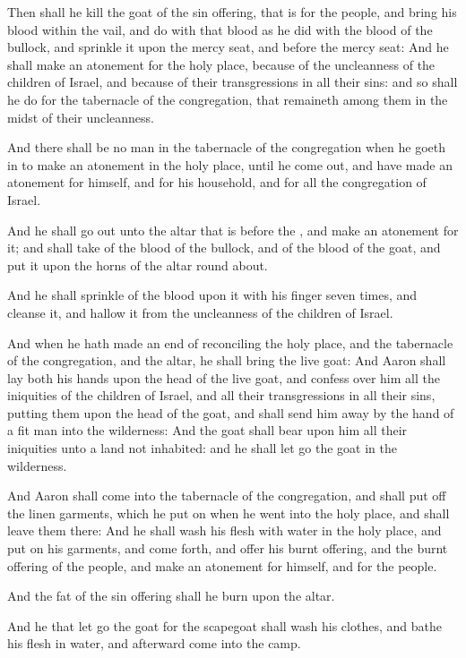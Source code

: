 \Verse Then shall he kill the goat of the sin offering, that is for the people, and bring his blood within the vail, and do with that blood as he did with the blood of the bullock, and sprinkle it upon the mercy seat, and before the mercy seat: \Verse And he shall make an atonement for the holy place, because of the uncleanness of the children of Israel, and because of their transgressions in all their sins: and so shall he do for the tabernacle of the congregation, that remaineth among them in the midst of their uncleanness.

\Verse And there shall be no man in the tabernacle of the congregation when he goeth in to make an atonement in the holy place, until he come out, and have made an atonement for himself, and for his household, and for all the congregation of Israel.

\Verse And he shall go out unto the altar that is before the \LORD, and make an atonement for it; and shall take of the blood of the bullock, and of the blood of the goat, and put it upon the horns of the altar round about.

\Verse And he shall sprinkle of the blood upon it with his finger seven times, and cleanse it, and hallow it from the uncleanness of the children of Israel.

\Verse And when he hath made an end of reconciling the holy place, and the tabernacle of the congregation, and the altar, he shall bring the live goat: \Verse And Aaron shall lay both his hands upon the head of the live goat, and confess over him all the iniquities of the children of Israel, and all their transgressions in all their sins, putting them upon the head of the goat, and shall send him away by the hand of a fit man into the wilderness: \Verse And the goat shall bear upon him all their iniquities unto a land not inhabited: and he shall let go the goat in the wilderness.

\Verse And Aaron shall come into the tabernacle of the congregation, and shall put off the linen garments, which he put on when he went into the holy place, and shall leave them there: \Verse And he shall wash his flesh with water in the holy place, and put on his garments, and come forth, and offer his burnt offering, and the burnt offering of the people, and make an atonement for himself, and for the people.

\Verse And the fat of the sin offering shall he burn upon the altar.

\Verse And he that let go the goat for the scapegoat shall wash his clothes, and bathe his flesh in water, and afterward come into the camp.

